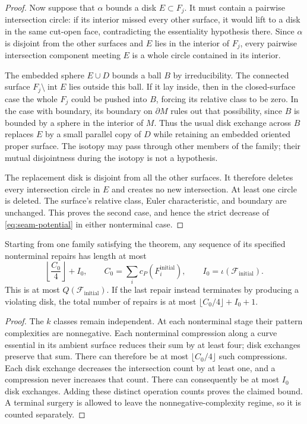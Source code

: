 \begin{proof}
Now suppose that $\alpha$ bounds a disk $E\subset F_j$.  It must
contain a pairwise intersection circle: if its interior missed every
other surface, it would lift to a disk in the same cut-open face,
contradicting the essentiality hypothesis there.  Since $\alpha$ is
disjoint from the other surfaces and $E$ lies in the interior of
$F_j$, every pairwise intersection component meeting $E$ is a whole
circle contained in its interior.

The embedded sphere $E\cup D$ bounds a ball $B$ by irreducibility.
The connected surface $F_j\setminus\operatorname{int}E$ lies outside
this ball.  If it lay inside, then in the closed-surface case the whole
$F_j$ could be pushed into $B$, forcing its relative class to be zero.
In the case with boundary, its boundary on $\partial M$ rules out that
possibility, since $B$ is bounded by a sphere in the interior of $M$.
Thus the usual disk exchange across $B$ replaces $E$ by a small
parallel copy of $D$ while retaining an embedded oriented proper
surface.  The isotopy may pass through other members of the family;
their mutual disjointness during the isotopy is not a hypothesis.

The replacement disk is disjoint from all the other surfaces.  It
therefore deletes every intersection circle in $E$ and creates no new
intersection.  At least one circle is deleted.  The surface's relative
class, Euler characteristic, and boundary are unchanged.  This proves
the second case, and hence the strict decrease of
\eqref{eq:seam-potential} in either nonterminal case.
\end{proof}

\begin{corollary}
\label{cor:seam-budget}
Starting from one family satisfying the theorem, any sequence of its
specified nonterminal repairs has length at most
\[
             \left\lfloor\frac{C_0}{4}\right\rfloor+I_0,
 \qquad C_0=\sum_i c_P(F_i^{\mathrm{initial}}),
 \qquad I_0=\iota(\mathcal F_{\mathrm{initial}}).
\]
This is at most $Q(\mathcal F_{\mathrm{initial}})$.  If the last repair
instead terminates by producing a violating disk, the total number of
repairs is at most
$\lfloor C_0/4\rfloor+I_0+1$.
\end{corollary}

\begin{proof}
The $k$ classes remain independent.  At each nonterminal stage their
pattern complexities are nonnegative.  Each nonterminal compression
along a curve essential in its ambient surface reduces their sum by at
least four; disk exchanges preserve that sum.  There can therefore be at
most $\lfloor C_0/4\rfloor$ such compressions.  Each disk exchange
decreases the intersection count by at least one, and a compression never
increases that count.  There can consequently be at most $I_0$ disk
exchanges.  Adding these distinct operation counts proves the claimed
bound.  A terminal surgery is allowed to leave the nonnegative-complexity
regime, so it is counted separately.
\end{proof}

